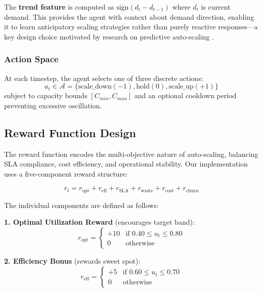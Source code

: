 \documentclass[conference]{IEEEtran}
\begin{document}
The \textbf{trend feature} is computed as $\text{sign}(d_t - d_{t-1})$ where $d_t$ is current demand. This provides the agent with context about demand direction, enabling it to learn anticipatory scaling strategies rather than purely reactive responses---a key design choice motivated by research on predictive auto-scaling \cite{xu2022}.

\subsubsection{Action Space}
At each timestep, the agent selects one of three discrete actions:
\begin{equation}
a_t \in \mathcal{A} = \{\text{scale\_down}(-1), \text{hold}(0), \text{scale\_up}(+1)\}
\end{equation}
subject to capacity bounds $[C_{min}, C_{max}]$ and an optional cooldown period preventing excessive oscillation.

\subsection{Reward Function Design}
The reward function encodes the multi-objective nature of auto-scaling, balancing SLA compliance, cost efficiency, and operational stability. Our implementation uses a five-component reward structure:

\begin{equation}
r_t = r_{\text{opt}} + r_{\text{eff}} + r_{\text{SLA}} + r_{\text{waste}} + r_{\text{cost}} + r_{\text{churn}}
\label{eq:reward}
\end{equation}

The individual components are defined as follows:

\textbf{1. Optimal Utilization Reward} (encourages target band):
\begin{equation}
r_{\text{opt}} = \begin{cases}
+10 & \text{if } 0.40 \leq u_t \leq 0.80 \\
0 & \text{otherwise}
\end{cases}
\end{equation}

\textbf{2. Efficiency Bonus} (rewards sweet spot):
\begin{equation}
r_{\text{eff}} = \begin{cases}
+5 & \text{if } 0.60 \leq u_t \leq 0.70 \\
0 & \text{otherwise}
\end{cases}
\end{equation}
\end{document}

